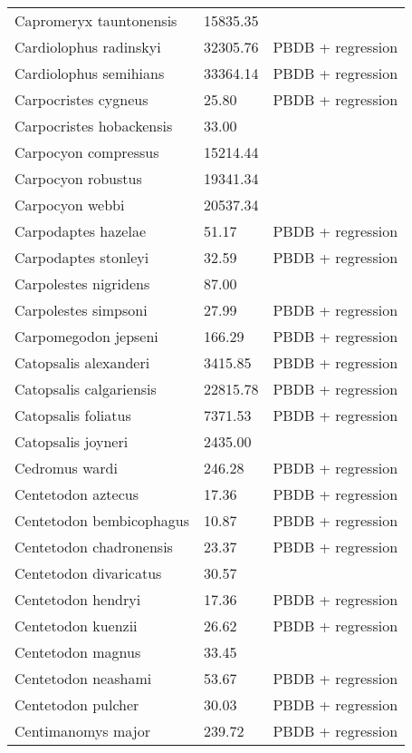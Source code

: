 \documentclass{article}
\begin{document}
\begin{center}
\begin{longtable}{p{} p{} p{} }
  Capromeryx tauntonensis & 15835.35 & \cite{Tomiya2013} \\ 
  Cardiolophus radinskyi & 32305.76 & PBDB + regression \\ 
  Cardiolophus semihians & 33364.14 & PBDB + regression \\ 
  Carpocristes cygneus & 25.80 & PBDB + regression \\ 
  Carpocristes hobackensis & 33.00 & \cite{Soligo2006} \\ 
  Carpocyon compressus & 15214.44 & \cite{Tomiya2013} \\ 
  Carpocyon robustus & 19341.34 & \cite{Tomiya2013} \\ 
  Carpocyon webbi & 20537.34 & \cite{Tomiya2013} \\ 
  Carpodaptes hazelae & 51.17 & PBDB + regression \\ 
  Carpodaptes stonleyi & 32.59 & PBDB + regression \\ 
  Carpolestes nigridens & 87.00 & \cite{Scott2003a} \\ 
  Carpolestes simpsoni & 27.99 & PBDB + regression \\ 
  Carpomegodon jepseni & 166.29 & PBDB + regression \\ 
  Catopsalis alexanderi & 3415.85 & PBDB + regression \\ 
  Catopsalis calgariensis & 22815.78 & PBDB + regression \\ 
  Catopsalis foliatus & 7371.53 & PBDB + regression \\ 
  Catopsalis joyneri & 2435.00 & \cite{Wilson2012} \\ 
  Cedromus wardi & 246.28 & PBDB + regression \\ 
  Centetodon aztecus & 17.36 & PBDB + regression \\ 
  Centetodon bembicophagus & 10.87 & PBDB + regression \\ 
  Centetodon chadronensis & 23.37 & PBDB + regression \\ 
  Centetodon divaricatus & 30.57 & \cite{Tomiya2013} \\ 
  Centetodon hendryi & 17.36 & PBDB + regression \\ 
  Centetodon kuenzii & 26.62 & PBDB + regression \\ 
  Centetodon magnus & 33.45 & \cite{Tomiya2013} \\ 
  Centetodon neashami & 53.67 & PBDB + regression \\ 
  Centetodon pulcher & 30.03 & PBDB + regression \\ 
  Centimanomys major & 239.72 & PBDB + regression \\ 

\end{longtable}
\end{center}
\end{document}
